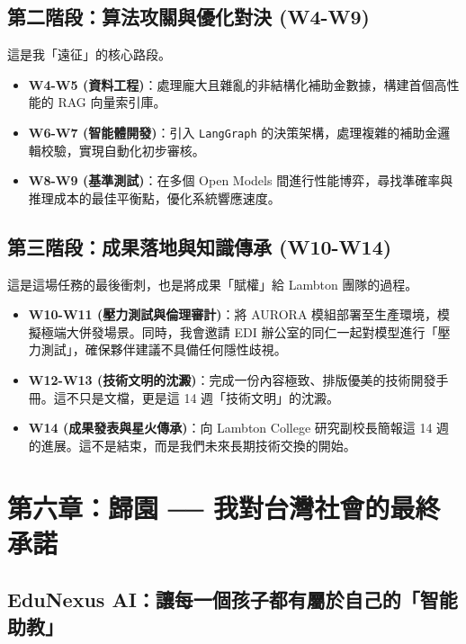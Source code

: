 \documentclass[12pt,a4paper]{article}
\begin{document}
\newpage

\subsection{第二階段：算法攻關與優化對決 (W4-W9)}
這是我「遠征」的核心路段。
\begin{itemize}
    \item \textbf{W4-W5 (資料工程)}：處理龐大且雜亂的非結構化補助金數據，構建首個高性能的 RAG 向量索引庫。
    \item \textbf{W6-W7 (智能體開發)}：引入 \texttt{LangGraph} 的決策架構，處理複雜的補助金邏輯校驗，實現自動化初步審核。
    \item \textbf{W8-W9 (基準測試)}：在多個 Open Models 間進行性能博弈，尋找準確率與推理成本的最佳平衡點，優化系統響應速度。
\end{itemize}

\newpage

\subsection{第三階段：成果落地與知識傳承 (W10-W14)}
這是這場任務的最後衝刺，也是將成果「賦權」給 Lambton 團隊的過程。

\begin{itemize}
    \item \textbf{W10-W11 (壓力測試與倫理審計)}：將 AURORA 模組部署至生產環境，模擬極端大併發場景。同時，我會邀請 EDI 辦公室的同仁一起對模型進行「壓力測試」，確保夥伴建議不具備任何隱性歧視。
    \item \textbf{W12-W13 (技術文明的沈澱)}：完成一份內容極致、排版優美的技術開發手冊。這不只是文檔，更是這 14 週「技術文明」的沈澱。
    \item \textbf{W14 (成果發表與星火傳承)}：向 Lambton College 研究副校長簡報這 14 週的進展。這不是結束，而是我們未來長期技術交換的開始。
\end{itemize}

\newpage

\newpage

\section{第六章：歸園 ── 我對台灣社會的最終承諾}

\subsection{ EduNexus AI：讓每一個孩子都有屬於自己的「智能助教」}
\end{document}

